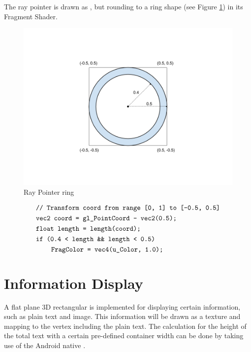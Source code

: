 The ray pointer is drawn as , but rounding to a ring shape (see Figure \ref{fig:ray-pointer-point2ring}) in its Fragment Shader.

\begin{figure}[H]
	\caption{Ray Pointer ring}
	\label{fig:ray-pointer-point2ring}
	\centering
	\includegraphics[width=\linewidth]{Figures/ray-pointer-point2ring.png}
	\decoRule
\end{figure}

\[
\begin{array}{lr}
\begin{aligned}
&\texttt{// Transform coord from range [0, 1] to [-0.5, 0.5]}\\
&\texttt{vec2 coord = gl\_PointCoord - vec2(0.5);}\\
&\texttt{float length = length(coord);}\\
&\texttt{if (0.4 < length \&\& length < 0.5)}\\
&\;\;\;\;\;\;\;\;\texttt{FragColor = vec4(u\_Color, 1.0);}
\end{aligned}
\end{array}
\]

\section{Information Display}

A flat plane 3D rectangular  is implemented for displaying certain information, such as plain text and image. This information will be drawn as a texture and mapping to the  vertex including the plain text. The calculation for the height of the total text with a certain pre-defined container width can be done by taking use of the Android native . 

